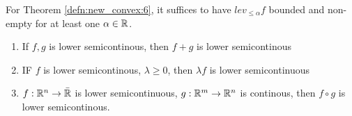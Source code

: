 \begin{remark}
  For Theorem \ref{defn:new_convex:6}, it suffices to have $lev_{\leq
    \alpha} f$ bounded and non-empty for at least one $\alpha \in \mathbb{R}$. 
\end{remark}

\begin{proposition}
  \begin{enumerate}
  \item If $f,g $ is lower semicontinous, then $f + g$ is lower semicontinous
  \item IF $f$ is lower semicontinous, $\lambda \geq 0$, then
    $\lambda f$ is lower semicontinuous
  \item $f: \mathbb{R}^{n} \rightarrow \bar {\mathbb{R}}$ is lower semicontinuous, $g:
    \mathbb{R}^{m} \rightarrow \mathbb{R}^{n}$ is continous, then $f \circ g$ is lower semicontinous.
  \end{enumerate}
\end{proposition}



